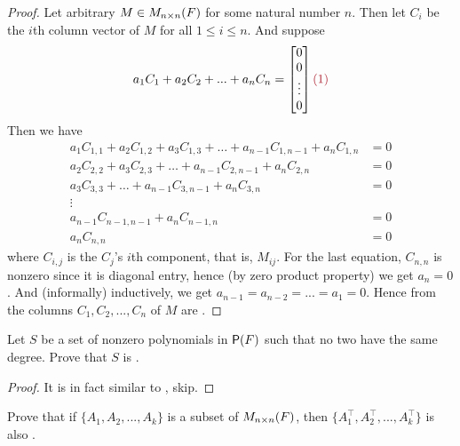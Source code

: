 \begin{proof}
Let arbitrary \(M \in M_{n \times n}(F)\) for some natural number \(n\).
Then let \(C_i\) be the \(i\)th column vector of \(M\) for all \(1 \le i \le n\).
And suppose
\[
    a_1 C_1 + a_2 C_2 + ... + a_n C_n = \begin{bmatrix}
        0 \\
        0 \\
        \vdots \\
        0
    \end{bmatrix} \MAROON{(1)}
\]
Then we have
\[
\begin{aligned}
a_{1} C_{1, 1} + a_{2} C_{1, 2} + a_{3} C_{1, 3} + \ldots + a_{n-1} C_{1, n-1} + a_{n} C_{1, n} & = 0 \\
                 a_{2} C_{2, 2} + a_{3} C_{2, 3} + \ldots + a_{n-1} C_{2, n-1} + a_{n} C_{2, n} & = 0 \\
                                  a_{3} C_{3, 3} + \ldots + a_{n-1} C_{3, n-1} + a_{n} C_{3, n} & = 0 \\
                                                                                         \vdots & \\
                                                            a_{n-1} C_{n-1, n-1} + a_{n} C_{n-1, n} & = 0 \\
                                                                                 a_{n} C_{n, n} & = 0
\end{aligned}
\]
where \(C_{i,j}\) is the \(C_j\)'s \(i\)th component, that is, \(M_{ij}\).
For the last equation, \(C_{n,n}\) is nonzero since it is diagonal entry, hence (by zero product property) we get \(a_n = 0\).
And (informally) inductively, we get \(a_{n - 1} = a_{n - 2} = ... = a_1 = 0\).
Hence from  the columns \(C_1, C_2, ..., C_n\) of \(M\) are \LID{}.
\end{proof}

\begin{exercise} \label{exercise 1.5.18}
Let \(S\) be a set of nonzero polynomials in \(\textsf{P}(F)\) such that no two have the same degree. 
Prove that \(S\) is \LID{}.
\end{exercise}

\begin{proof}
It is in fact similar to , skip.
\end{proof}

\begin{exercise} \label{exercise 1.5.19}
Prove that if \(\{ A_1, A_2, ..., A_k \}\) is a \LID{} subset of \(M_{n \times n}(F)\), then \(\{ A^\top_1, A^\top_2, ..., A^\top_k \}\) is also \LID{}.
\end{exercise}

